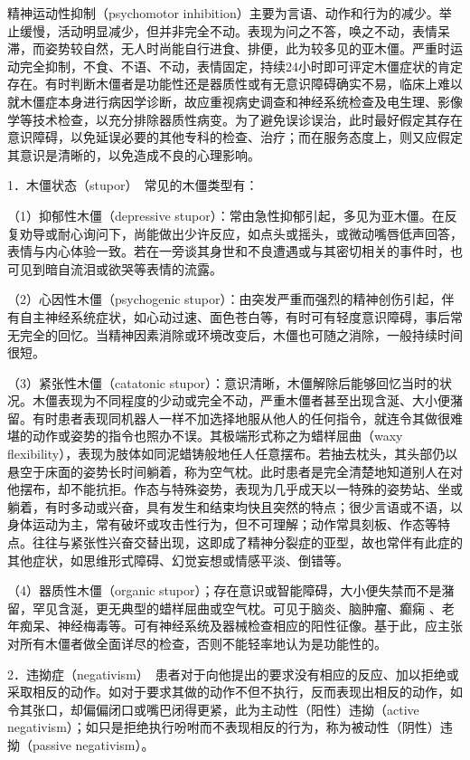 精神运动性抑制（psychomotor
inhibition）主要为言语、动作和行为的减少。举止缓慢，活动明显减少，但并非完全不动。表现为问之不答，唤之不动，表情呆滞，而姿势较自然，无人时尚能自行进食、排便，此为较多见的亚木僵。严重时运动完全抑制，不食、不语、不动，表情固定，持续24小时即可评定木僵症状的肯定存在。有时判断木僵者是功能性还是器质性或有无意识障碍确实不易，临床上难以就木僵症本身进行病因学诊断，故应重视病史调查和神经系统检查及电生理、影像学等技术检查，以充分排除器质性病变。为了避免误诊误治，此时最好假定其存在意识障碍，以免延误必要的其他专科的检查、治疗；而在服务态度上，则又应假定其意识是清晰的，以免造成不良的心理影响。

1．木僵状态（stupor）　常见的木僵类型有：

（1）抑郁性木僵（depressive
stupor）：常由急性抑郁引起，多见为亚木僵。在反复劝导或耐心询问下，尚能做出少许反应，如点头或摇头，或微动嘴唇低声回答，表情与内心体验一致。若在一旁谈其身世和不良遭遇或与其密切相关的事件时，也可见到暗自流泪或欲哭等表情的流露。

（2）心因性木僵（psychogenic
stupor）：由突发严重而强烈的精神创伤引起，伴有自主神经系统症状，如心动过速、面色苍白等，有时可有轻度意识障碍，事后常无完全的回忆。当精神因素消除或环境改变后，木僵也可随之消除，一般持续时间很短。

（3）紧张性木僵（catatonic
stupor）：意识清晰，木僵解除后能够回忆当时的状况。木僵表现为不同程度的少动或完全不动，严重木僵者甚至出现含涎、大小便潴留。有时患者表现同机器人一样不加选择地服从他人的任何指令，就连令其做很难堪的动作或姿势的指令也照办不误。其极端形式称之为蜡样屈曲（waxy
flexibility），表现为肢体如同泥蜡铸般地任人任意摆布。若抽去枕头，其头部仍以悬空于床面的姿势长时间躺着，称为空气枕。此时患者是完全清楚地知道别人在对他摆布，却不能抗拒。作态与特殊姿势，表现为几乎成天以一特殊的姿势站、坐或躺着，有时多动或兴奋，具有发生和结束均快且突然的特点；很少言语或不语，以身体运动为主，常有破坏或攻击性行为，但不可理解；动作常具刻板、作态等特点。往往与紧张性兴奋交替出现，这即成了精神分裂症的亚型，故也常伴有此症的其他症状，如思维形式障碍、幻觉妄想或情感平淡、倒错等。

（4）器质性木僵（organic
stupor）；存在意识或智能障碍，大小便失禁而不是潴留，罕见含涎，更无典型的蜡样屈曲或空气枕。可见于脑炎、脑肿瘤、癫痫
、老年痴呆、神经梅毒等。可有神经系统及器械检查相应的阳性征像。基于此，应主张对所有木僵者做全面详尽的检查，否则不能轻率地认为是功能性的。

2．违拗症（negativism）　患者对于向他提出的要求没有相应的反应、加以拒绝或采取相反的动作。如对于要求其做的动作不但不执行，反而表现出相反的动作，如令其张口，却偏偏闭口或嘴巴闭得更紧，此为主动性（阳性）违拗（active
negativism）；如只是拒绝执行吩咐而不表现相反的行为，称为被动性（阴性）违拗（passive
negativism）。

